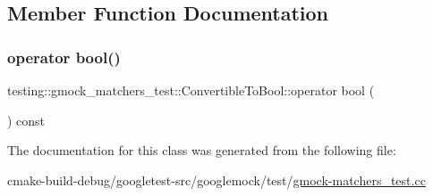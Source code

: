 \subsection{Member Function Documentation}
\mbox{\label{classtesting_1_1gmock__matchers__test_1_1ConvertibleToBool_a4ad9766b9d5179a1207af2449405f071}} 
\subsubsection{\texorpdfstring{operator bool()}{operator bool()}}
{\footnotesize\ttfamily testing\+::gmock\+\_\+matchers\+\_\+test\+::\+Convertible\+To\+Bool\+::operator bool (\begin{DoxyParamCaption}{ }\end{DoxyParamCaption}) const\hspace{0.3cm}{\ttfamily [inline]}}



The documentation for this class was generated from the following file\+:\begin{DoxyCompactItemize}
\item 
cmake-\/build-\/debug/googletest-\/src/googlemock/test/\mbox{\hyperlink{gmock-matchers__test_8cc}{gmock-\/matchers\+\_\+test.\+cc}}\end{DoxyCompactItemize}

